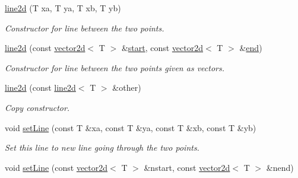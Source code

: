 \begin{DoxyCompactItemize}
\hyperlink{classirr_1_1core_1_1line2d_af9614350cdb0527c190dcf3342ecb42e}{line2d} (T xa, T ya, T xb, T yb)
\begin{DoxyCompactList}\small\item\em Constructor for line between the two points. \end{DoxyCompactList}\item 
\mbox{\label{classirr_1_1core_1_1line2d_a447958017eba9f8667625b82c25f344c}} 
\hyperlink{classirr_1_1core_1_1line2d_a447958017eba9f8667625b82c25f344c}{line2d} (const \hyperlink{classirr_1_1core_1_1vector2d}{vector2d}$<$ T $>$ \&\hyperlink{classirr_1_1core_1_1line2d_a1d8c9b41f3c8d9c352deb5160f100c65}{start}, const \hyperlink{classirr_1_1core_1_1vector2d}{vector2d}$<$ T $>$ \&\hyperlink{classirr_1_1core_1_1line2d_ab5708ad88b14fb601450e9c8765a613d}{end})
\begin{DoxyCompactList}\small\item\em Constructor for line between the two points given as vectors. \end{DoxyCompactList}\item 
\mbox{\label{classirr_1_1core_1_1line2d_a19338e17d69fa3062709ebd7b7f73409}} 
\hyperlink{classirr_1_1core_1_1line2d_a19338e17d69fa3062709ebd7b7f73409}{line2d} (const \hyperlink{classirr_1_1core_1_1line2d}{line2d}$<$ T $>$ \&other)
\begin{DoxyCompactList}\small\item\em Copy constructor. \end{DoxyCompactList}\item 
\mbox{\label{classirr_1_1core_1_1line2d_a65224228a0681a6be6f2576fb0093a12}} 
void \hyperlink{classirr_1_1core_1_1line2d_a65224228a0681a6be6f2576fb0093a12}{set\+Line} (const T \&xa, const T \&ya, const T \&xb, const T \&yb)
\begin{DoxyCompactList}\small\item\em Set this line to new line going through the two points. \end{DoxyCompactList}\item 
\mbox{\label{classirr_1_1core_1_1line2d_a2573eb6b41d08ae4ab16be2630168d3b}} 
void \hyperlink{classirr_1_1core_1_1line2d_a2573eb6b41d08ae4ab16be2630168d3b}{set\+Line} (const \hyperlink{classirr_1_1core_1_1vector2d}{vector2d}$<$ T $>$ \&nstart, const \hyperlink{classirr_1_1core_1_1vector2d}{vector2d}$<$ T $>$ \&nend)

\end{DoxyCompactItemize}
